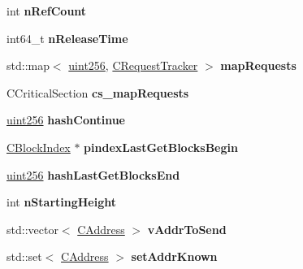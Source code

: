 \begin{DoxyCompactItemize}
\item 
\mbox{\label{class_c_node_a01f8cac776bef676651f9b8f3f80ae98}} 
int {\bfseries n\+Ref\+Count}
\item 
\mbox{\label{class_c_node_ab257d67d213356bfd9a7679a7196cb22}} 
int64\+\_\+t {\bfseries n\+Release\+Time}
\item 
\mbox{\label{class_c_node_a3531ba0585ead8ea14916d9536cc8933}} 
std\+::map$<$ \mbox{\hyperlink{classuint256}{uint256}}, \mbox{\hyperlink{class_c_request_tracker}{C\+Request\+Tracker}} $>$ {\bfseries map\+Requests}
\item 
\mbox{\label{class_c_node_a67929054c9a79d1eeb1239c39c59884d}} 
C\+Critical\+Section {\bfseries cs\+\_\+map\+Requests}
\item 
\mbox{\label{class_c_node_a1a1c0d94de0197c5c4abf5a8d13364f3}} 
\mbox{\hyperlink{classuint256}{uint256}} {\bfseries hash\+Continue}
\item 
\mbox{\label{class_c_node_ac655c80f7fbef266417985776043785b}} 
\mbox{\hyperlink{class_c_block_index}{C\+Block\+Index}} $\ast$ {\bfseries pindex\+Last\+Get\+Blocks\+Begin}
\item 
\mbox{\label{class_c_node_a00f1eb04110387df966dd9c3ff3c53fb}} 
\mbox{\hyperlink{classuint256}{uint256}} {\bfseries hash\+Last\+Get\+Blocks\+End}
\item 
\mbox{\label{class_c_node_a597b41bd64e2ac9391b7211e65aeb52a}} 
int {\bfseries n\+Starting\+Height}
\item 
\mbox{\label{class_c_node_a9b2d9b9182ff111c79f704594c4aa2e1}} 
std\+::vector$<$ \mbox{\hyperlink{class_c_address}{C\+Address}} $>$ {\bfseries v\+Addr\+To\+Send}
\item 
\mbox{\label{class_c_node_acc87ca522712199a5586bc9caaab345e}} 
std\+::set$<$ \mbox{\hyperlink{class_c_address}{C\+Address}} $>$ {\bfseries set\+Addr\+Known}
\item 
\mbox{\label{class_c_node_a3da9c559959e182aff8439cd004ff624}} 

\end{DoxyCompactItemize}
